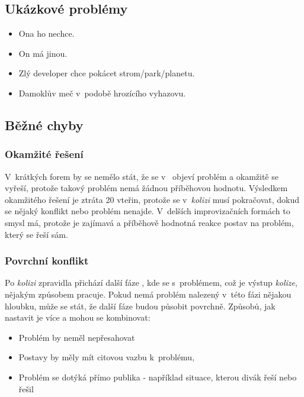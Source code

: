 \subsection{ Ukázkové problémy } \begin{itemize}
\item  Ona ho nechce.
\item  On má jinou.
\item  Zlý developer chce pokácet strom/park/planetu.
\item  Damoklův meč v~podobě hrozícího vyhazovu.
\end{itemize}
 
 
\subsection{ Běžné chyby }  
\subsubsection{ Okamžité řešení } V~krátkých forem by se nemělo stát, že se v~ objeví problém a okamžitě se vyřeší, protože takový problém nemá žádnou příběhovou hodnotu. Výsledkem okamžitého řešení je ztráta 20 vteřin, protože se v~\textit{kolizi} musí pokračovat, dokud se nějaký konflikt nebo problém nenajde. V~delších improvizačních formách to smysl má, protože je zajímavá a příběhově hodnotná reakce postav na problém, který se řeší sám. 
 
\subsubsection{ Povrchní konflikt } Po \textit{kolizi} zpravidla přichází další fáze , kde se s~problémem, což je výstup \textit{kolize}, nějakým způsobem pracuje. Pokud nemá problém nalezený v~této fázi nějakou hloubku, může se stát, že další fáze  budou působit povrchně. Způsobů, jak nastavit   je více a mohou se kombinovat: 
 
\begin{itemize}
\item  Problém by neměl nepřesahovat  
\item  Postavy by měly mít citovou vazbu k~problému,  
\item  Problém se dotýká přímo publika - například situace, kterou divák řeší nebo řešil
\end{itemize}
 
